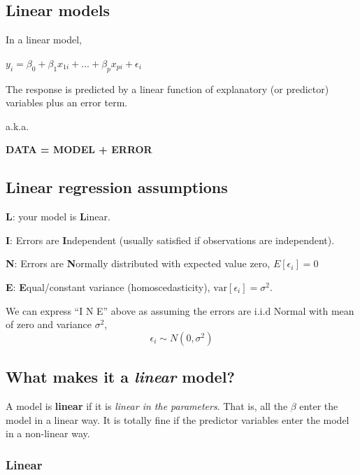 \documentclass[
  openany]{book}
\begin{document}
\hypertarget{linear-models}{%
\subsection{Linear models}\label{linear-models}}

In a linear model,

\(y_i = \beta_0 + \beta_1x_{1i} + ... + \beta_px_{pi} + \epsilon_i\)

The response is predicted by a linear function of
explanatory (or predictor) variables plus an error term.

a.k.a.

\textbf{DATA = MODEL + ERROR}

\hypertarget{linear-regression-assumptions}{%
\subsection{Linear regression assumptions}\label{linear-regression-assumptions}}

\textbf{L}: your model is \textbf{L}inear.

\textbf{I}: Errors are \textbf{I}ndependent (usually satisfied if observations are independent).

\textbf{N}: Errors are \textbf{N}ormally distributed with expected value zero, \(E[\epsilon_i]=0\)

\textbf{E}: \textbf{E}qual/constant variance (homoscedasticity), \(\text{var}[\epsilon_i] = \sigma^2\).

We can express ``I N E'' above as assuming the errors are i.i.d Normal with mean of zero and variance \(\sigma^2\),
\[\epsilon_i \sim N(0, \sigma^2)\]

\hypertarget{what-makes-it-a-linear-model}{%
\subsection{\texorpdfstring{What makes it a \emph{linear} model?}{What makes it a linear model?}}\label{what-makes-it-a-linear-model}}

A model is \textbf{linear} if it is \emph{linear in the parameters}. That is, all the \(\beta\) enter the model in a linear way. It is totally fine if the predictor variables enter the model in a non-linear way.

\hypertarget{linear}{%
\subsubsection{Linear}\label{linear}}
\end{document}

